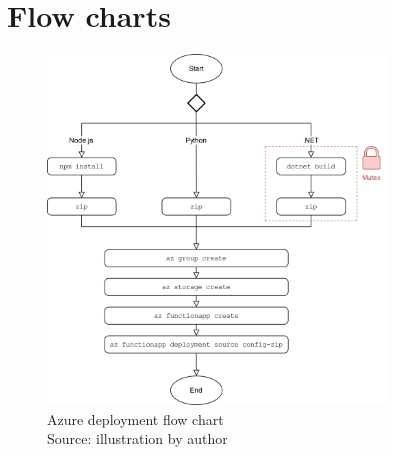\chapter{Flow charts}
\label{chapter:flow_charts}

\begin{figure}[htp]
\begin{center}
\includegraphics[width=0.8\textwidth]{bilder/Azure_Deploy_Flow.png}
\captionsetup{justification=centering, labelfont=bf}
\caption[Azure deployment flow chart]{Azure deployment flow chart\\Source: illustration by author}
\label{fig:azure_deploy}
\end{center}
\end{figure}

